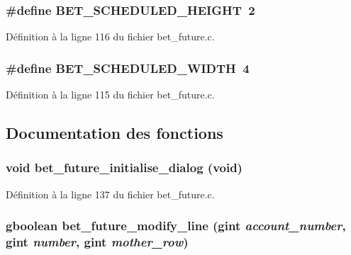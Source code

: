 \subsubsection[{BET\_\-SCHEDULED\_\-HEIGHT}]{\setlength{\rightskip}{0pt plus 5cm}\#define BET\_\-SCHEDULED\_\-HEIGHT~2}\label{bet__future_8c_a5ff48c89a9296c5cf66e6b33c1bca11c}


Définition à la ligne 116 du fichier bet\_\-future.c.

\subsubsection[{BET\_\-SCHEDULED\_\-WIDTH}]{\setlength{\rightskip}{0pt plus 5cm}\#define BET\_\-SCHEDULED\_\-WIDTH~4}\label{bet__future_8c_a10d8870f99c7abbffdc2ed9c3c5847da}


Définition à la ligne 115 du fichier bet\_\-future.c.



\subsection{Documentation des fonctions}
\subsubsection[{bet\_\-future\_\-initialise\_\-dialog}]{\setlength{\rightskip}{0pt plus 5cm}void bet\_\-future\_\-initialise\_\-dialog (void)}\label{bet__future_8c_ab9f4286a82ff1209786e6f1720a9990c}


Définition à la ligne 137 du fichier bet\_\-future.c.

\subsubsection[{bet\_\-future\_\-modify\_\-line}]{\setlength{\rightskip}{0pt plus 5cm}gboolean bet\_\-future\_\-modify\_\-line (gint {\em account\_\-number}, \/  gint {\em number}, \/  gint {\em mother\_\-row})}\label{bet__future_8c_ae40824ff68f1d0feb3492cb0ae14d8ae}


